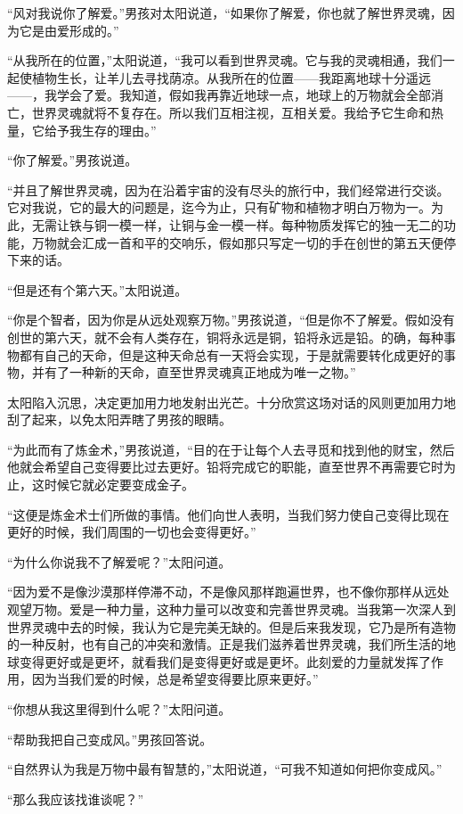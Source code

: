 \documentclass[twoside,openany]{book}
\begin{document}
“风对我说你了解爱。”男孩对太阳说道，“如果你了解爱，你也就了解世界灵魂，因为它是由爱形成的。”

“从我所在的位置，”太阳说道，“我可以看到世界灵魂。它与我的灵魂相通，我们一起使植物生长，让羊儿去寻找荫凉。从我所在的位置——我距离地球十分遥远——，我学会了爱。我知道，假如我再靠近地球一点，地球上的万物就会全部消亡，世界灵魂就将不复存在。所以我们互相注视，互相关爱。我给予它生命和热量，它给予我生存的理由。”

“你了解爱。”男孩说道。

“并且了解世界灵魂，因为在沿着宇宙的没有尽头的旅行中，我们经常进行交谈。它对我说，它的最大的问题是，迄今为止，只有矿物和植物才明白万物为一。为此，无需让铁与铜一模一样，让铜与金一模一样。每种物质发挥它的独一无二的功能，万物就会汇成一首和平的交响乐，假如那只写定一切的手在创世的第五天便停下来的话。

“但是还有个第六天。”太阳说道。

“你是个智者，因为你是从远处观察万物。”男孩说道，“但是你不了解爱。假如没有创世的第六天，就不会有人类存在，铜将永远是铜，铅将永远是铅。的确，每种事物都有自己的天命，但是这种天命总有一天将会实现，于是就需要转化成更好的事物，并有了一种新的天命，直至世界灵魂真正地成为唯一之物。”

太阳陷入沉思，决定更加用力地发射出光芒。十分欣赏这场对话的风则更加用力地刮了起来，以免太阳弄瞎了男孩的眼睛。

“为此而有了炼金术，”男孩说道，“目的在于让每个人去寻觅和找到他的财宝，然后他就会希望自己变得要比过去更好。铅将完成它的职能，直至世界不再需要它时为止，这时候它就必定要变成金子。

“这便是炼金术士们所做的事情。他们向世人表明，当我们努力使自己变得比现在更好的时候，我们周围的一切也会变得更好。”

“为什么你说我不了解爱呢？”太阳问道。

“因为爱不是像沙漠那样停滞不动，不是像风那样跑遍世界，也不像你那样从远处观望万物。爱是一种力量，这种力量可以改变和完善世界灵魂。当我第一次深人到世界灵魂中去的时候，我认为它是完美无缺的。但是后来我发现，它乃是所有造物的一种反射，也有自己的冲突和激情。正是我们滋养着世界灵魂，我们所生活的地球变得更好或是更坏，就看我们是变得更好或是更坏。此刻爱的力量就发挥了作用，因为当我们爱的时候，总是希望变得要比原来更好。”

“你想从我这里得到什么呢？”太阳问道。

“帮助我把自己变成风。”男孩回答说。

“自然界认为我是万物中最有智慧的，”太阳说道，“可我不知道如何把你变成风。”

“那么我应该找谁谈呢？”
\end{document}
